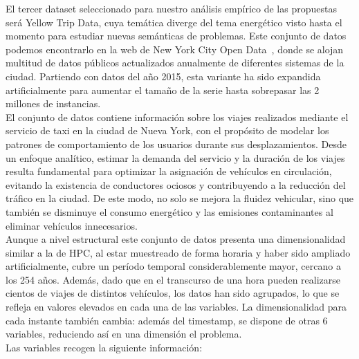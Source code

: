 El tercer dataset seleccionado para nuestro análisis empírico de las propuestas será Yellow Trip Data, cuya temática diverge del tema energético visto hasta el momento para estudiar nuevas semánticas de problemas. Este conjunto de datos podemos encontrarlo en la web de New York City Open Data~\cite{nycopendata}, donde se alojan multitud de datos públicos actualizados anualmente de diferentes sistemas de la ciudad. Partiendo con datos del año 2015, esta variante ha sido expandida artificialmente para aumentar el tamaño de la serie hasta sobrepasar las 2 millones de instancias.\\

El conjunto de datos contiene información sobre los viajes realizados mediante el servicio de taxi en la ciudad de Nueva York, con el propósito de modelar los patrones de comportamiento de los usuarios durante sus desplazamientos. Desde un enfoque analítico, estimar la demanda del servicio y la duración de los viajes resulta fundamental para optimizar la asignación de vehículos en circulación, evitando la existencia de conductores ociosos y contribuyendo a la reducción del tráfico en la ciudad. De este modo, no solo se mejora la fluidez vehicular, sino que también se disminuye el consumo energético y las emisiones contaminantes al eliminar vehículos innecesarios.\\

Aunque a nivel estructural este conjunto de datos presenta una dimensionalidad similar a la de HPC, al estar muestreado de forma horaria y haber sido ampliado artificialmente, cubre un período temporal considerablemente mayor, cercano a los 254 años. Además, dado que en el transcurso de una hora pueden realizarse cientos de viajes de distintos vehículos, los datos han sido agrupados, lo que se refleja en valores elevados en cada una de las variables. La dimensionalidad para cada instante también cambia: además del timestamp, se dispone de otras 6 variables, reduciendo así en una dimensión el problema.\\

Las variables recogen la siguiente información:

